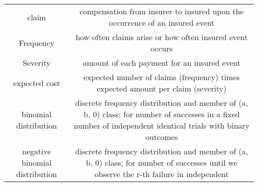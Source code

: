 \documentclass[]{book}
\theoremstyle{definition}
\theoremstyle{definition}
\theoremstyle{definition}
\theoremstyle{remark}
\begin{document}
\begin{longtable}[]{@{}cc@{}}
\toprule
\begin{minipage}[t]{0.43\columnwidth}\centering\strut
claim\strut
\end{minipage} & \begin{minipage}[t]{0.43\columnwidth}\centering\strut
compensation from insurer to insured upon the occurrence of an insured
event\strut
\end{minipage}\tabularnewline
\begin{minipage}[t]{0.43\columnwidth}\centering\strut
Frequency\strut
\end{minipage} & \begin{minipage}[t]{0.43\columnwidth}\centering\strut
how often claims arise or how often insured event occurs\strut
\end{minipage}\tabularnewline
\begin{minipage}[t]{0.43\columnwidth}\centering\strut
Severity\strut
\end{minipage} & \begin{minipage}[t]{0.43\columnwidth}\centering\strut
amount of each payment for an insured event\strut
\end{minipage}\tabularnewline
\begin{minipage}[t]{0.43\columnwidth}\centering\strut
expected cost\strut
\end{minipage} & \begin{minipage}[t]{0.43\columnwidth}\centering\strut
expected number of claims (frequency) times expected amount per claim
(severity)\strut
\end{minipage}\tabularnewline
\begin{minipage}[t]{0.43\columnwidth}\centering\strut
binomial distribution\strut
\end{minipage} & \begin{minipage}[t]{0.43\columnwidth}\centering\strut
discrete frequency distribution and member of (a, b, 0) class; for
number of successes in a fixed number of independent identical trials
with binary outcomes\strut
\end{minipage}\tabularnewline
\begin{minipage}[t]{0.43\columnwidth}\centering\strut
negative binomial distribution\strut
\end{minipage} & \begin{minipage}[t]{0.43\columnwidth}\centering\strut
discrete frequency distribution and member of (a, b, 0) class; for
number of successes until we observe the r-th failure in independent

\end{minipage}
\end{longtable}
\end{document}
